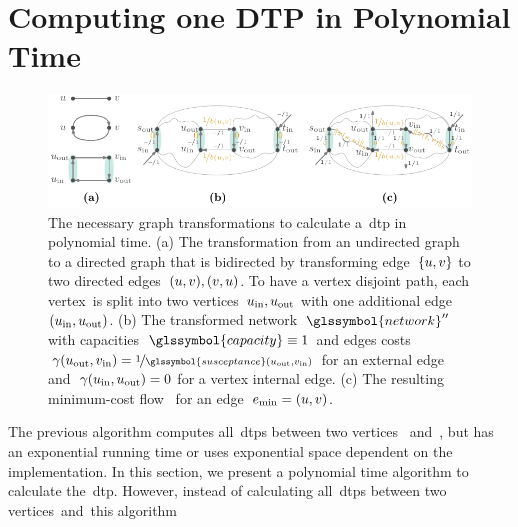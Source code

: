 % 
% 
\section{Computing one DTP in Polynomial Time}
\label{ch:switching:sec:computing_one_dtp}
% 
\begin{figure}[t!]
    \includegraphics{switchplacement/figures/polynomial_dtp_direct_edges.pdf}
    \caption[Necessary graph transformation to calculate a polynomial algorithm.]
    {The necessary graph transformations to calculate a~\gls{dtp} in polynomial
    time. (a) The transformation from an undirected graph to a directed graph
    that is bidirected by transforming edge~$\{u,v\}$ to two
    directed edges~$(u,v), (v,u)$. To have a vertex
    disjoint path, each vertex~\vertexa is split into two
    vertices~$u_{\mathrm{in}},u_{\mathrm{out}}$ with one
    additional edge~$(u_{\mathrm{in}},u_{\mathrm{out}})$. (b) The
    transformed network~$\glssymbol{network}''$ with
    capacities~$\glssymbol{capacity}\equiv 1$ and edges
    costs~$\gamma(\vertexa_{\mathrm{out}},\vertexb_{\mathrm{in}}) =
    \nicefrac{1}{\glssymbol{susceptance}(\vertexa_{\mathrm{out}},\vertexb_{
    \mathrm{in}})}$ for an external edge
    and~$\gamma(u_{\mathrm{in}},u_{\mathrm{out}}) = 0$ for a
    vertex internal edge. (c) The resulting minimum-cost flow~
    for an edge~$e_{\min} = (u,v)$. }%
    \label{ch:switching:sec:computing_one_dtp:fig:poly-alg}
\end{figure}
% 
The previous algorithm computes all~\gls{dtp}{s} between two vertices~\vertexa
and~\vertexb, but has an exponential running time or uses exponential space
dependent on the implementation. In this section, we present a polynomial time
algorithm to calculate the~\gls{dtp}. However, instead of calculating
all~\gls{dtp}{s} between two vertices~\vertexa and~\vertexb this algorithm
